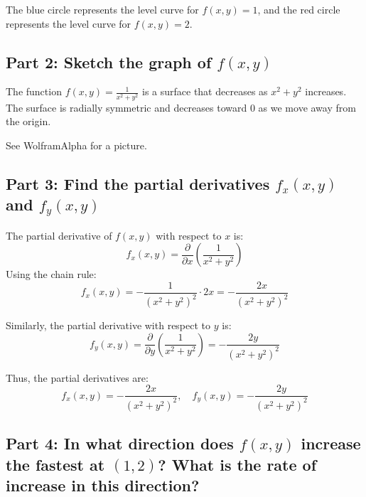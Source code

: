 \documentclass[11pt]{article}
\begin{document}
The blue circle represents the level curve for \( f(x, y) = 1 \), and the red circle represents the level curve for \( f(x, y) = 2 \).

\newpage

\subsection{Part 2: Sketch the graph of \( f(x, y) \)}

The function \( f(x, y) = \frac{1}{x^2 + y^2} \) is a surface that decreases as \( x^2 + y^2 \) increases. The surface is radially symmetric and decreases toward 0 as we move away from the origin.

See WolframAlpha for a picture.

%

\newpage

\subsection{Part 3: Find the partial derivatives \( f_x(x, y) \) and \( f_y(x, y) \)}

The partial derivative of \( f(x, y) \) with respect to \( x \) is:
\[
f_x(x, y) = \frac{\partial}{\partial x} \left( \frac{1}{x^2 + y^2} \right)
\]
Using the chain rule:
\[
f_x(x, y) = -\frac{1}{(x^2 + y^2)^2} \cdot 2x = -\frac{2x}{(x^2 + y^2)^2}
\]

Similarly, the partial derivative with respect to \( y \) is:
\[
f_y(x, y) = \frac{\partial}{\partial y} \left( \frac{1}{x^2 + y^2} \right) = -\frac{2y}{(x^2 + y^2)^2}
\]

Thus, the partial derivatives are:
\[
f_x(x, y) = -\frac{2x}{(x^2 + y^2)^2}, \quad f_y(x, y) = -\frac{2y}{(x^2 + y^2)^2}
\]

\newpage

\subsection{Part 4: In what direction does \( f(x, y) \) increase the fastest at \( (1, 2) \)? What is the rate of increase in this direction?}
\end{document}
